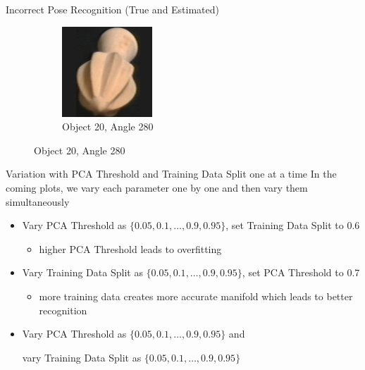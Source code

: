 \documentclass[aspectratio=169, handout, 10pt, hyperref=colorlinks]{beamer}
\begin{document}
\begin{frame}{Incorrect Pose Recognition (True and Estimated)}
\begin{figure}
\begin{subfigure}{0.32\linewidth}
            \includegraphics[width = 0.6\linewidth]{incorrect/obj21__280.png}
            \vspace{1em}
            \caption{Object 20, Angle 280}
        \end{subfigure}
    \end{figure}
\end{frame}
\begin{frame}{Variation with PCA Threshold and Training Data Split one at a time}
    In the coming plots, we vary each parameter one by one and then vary them simultaneously
    \begin{itemize}
        \item Vary PCA Threshold as $\{0.05, 0.1,\ldots, 0.9, 0.95\}$, set Training Data Split to 0.6
        \begin{itemize}
            \item higher PCA Threshold leads to overfitting 
        \end{itemize}
        \item Vary Training Data Split as $\{0.05, 0.1,\ldots, 0.9, 0.95\}$, set PCA Threshold to 0.7
        \begin{itemize}
            \item more training data creates more accurate manifold which leads to better recognition
        \end{itemize}
        \item Vary PCA Threshold as $\{0.05, 0.1,\ldots, 0.9, 0.95\}$ and 
        
        vary Training Data Split as $\{0.05, 0.1,\ldots, 0.9, 0.95\}$
    \end{itemize}
\end{frame}
\end{document}
